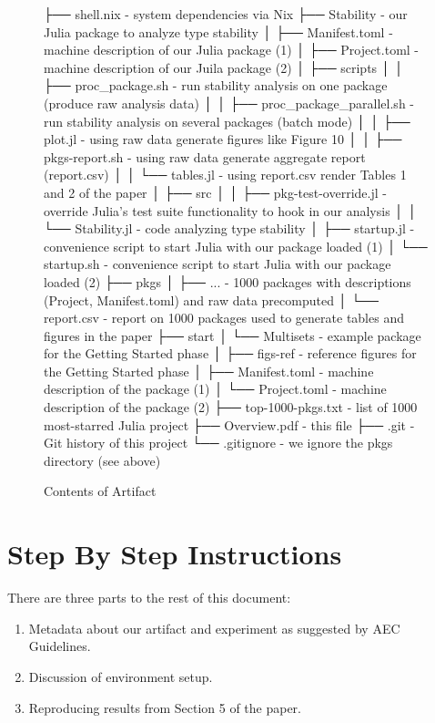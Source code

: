 \documentclass[
]{article}
\begin{document}
\begin{figure}[ht]
\label{fig:contents}
\begin{verbnobox}[\small]
├── shell.nix - system dependencies via Nix
├── Stability - our Julia package to analyze type stability
│  ├── Manifest.toml - machine description of our Julia package (1)
│  ├── Project.toml  - machine description of our Juila package (2)
│  ├── scripts
│  │  ├── proc_package.sh - run stability analysis on one package (produce raw analysis data)
│  │  ├── proc_package_parallel.sh - run stability analysis on several packages (batch mode)
│  │  ├── plot.jl - using raw data generate figures like Figure 10
│  │  ├── pkgs-report.sh - using raw data generate aggregate report (report.csv)
│  │  └── tables.jl - using report.csv render Tables 1 and 2 of the paper
│  ├── src
│  │  ├── pkg-test-override.jl - override Julia's test suite functionality to hook in our analysis
│  │  └── Stability.jl - code analyzing type stability
│  ├── startup.jl - convenience script to start Julia with our package loaded (1)
│  └── startup.sh - convenience script to start Julia with our package loaded (2)
├── pkgs
│  ├── ... - 1000 packages with descriptions ({Project, Manifest}.toml) and raw data precomputed
│  └── report.csv - report on 1000 packages used to generate tables and figures in the paper
├── start
│  └── Multisets - example package for the Getting Started phase
│     ├── figs-ref - reference figures for the Getting Started phase
│     ├── Manifest.toml - machine description of the package (1)
│     └── Project.toml - machine description of the package (2)
├── top-1000-pkgs.txt - list of 1000 most-starred Julia project
├── Overview.pdf - this file
├── .git - Git history of this project
└── .gitignore - we ignore the pkgs directory (see above)
\end{verbnobox}
\caption{Contents of Artifact}
\end{figure}

\hypertarget{step-by-step-instructions}{%
\section{Step By Step Instructions}\label{step-by-step-instructions}}

There are three parts to the rest of this document:

\begin{enumerate}
\def\labelenumi{\arabic{enumi}.}
\item
  Metadata about our artifact and experiment as suggested by AEC
  Guidelines.
\item
  Discussion of environment setup.
\item
  Reproducing results from Section 5 of the paper.
\end{enumerate}
\end{document}
